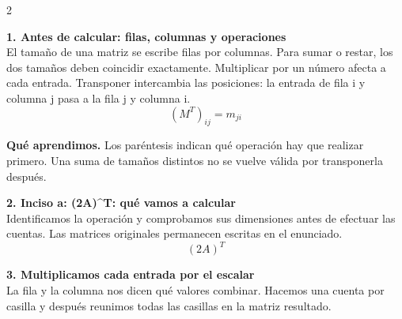 \documentclass[11pt,a4paper,landscape]{article}
\begin{document}
\begin{multicols*}{2}
\noindent\begin{minipage}{\linewidth}\textbf{1. Antes de calcular: filas, columnas y operaciones}\\[2pt]El tamaño de una matriz se escribe filas por columnas. Para sumar o restar, los dos tamaños deben coincidir exactamente. Multiplicar por un número afecta a cada entrada. Transponer intercambia las posiciones: la entrada de fila i y columna j pasa a la fila j y columna i.
\[(M^T)_{ij}=m_{ji}\]
\par\smallskip\textbf{Qué aprendimos.} Los paréntesis indican qué operación hay que realizar primero. Una suma de tamaños distintos no se vuelve válida por transponerla después.
\end{minipage}\par\medskip
\noindent\begin{minipage}{\linewidth}\textbf{2. Inciso a: (2A)\textasciicircum{}T: qué vamos a calcular}\\[2pt]Identificamos la operación y comprobamos sus dimensiones antes de efectuar las cuentas. Las matrices originales permanecen escritas en el enunciado.
\[(2A)^T\]
\end{minipage}\par\medskip
\noindent\begin{minipage}{\linewidth}\textbf{3. Multiplicamos cada entrada por el escalar}\\[2pt]La fila y la columna nos dicen qué valores combinar. Hacemos una cuenta por casilla y después reunimos todas las casillas en la matriz resultado.
\par{}\par\smallskip

\end{minipage}
\end{multicols*}
\end{document}
